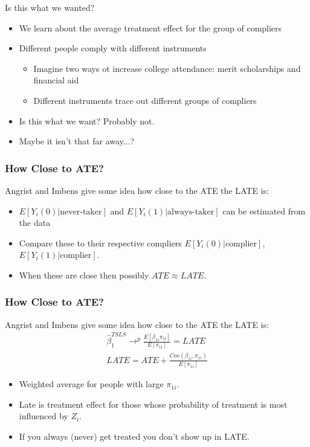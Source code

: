 \documentclass[xcolor=pdftex,dvipsnames,table,mathserif,aspectratio=169]{beamer}
\begin{document}
\begin{frame}{Is this what we wanted?}
\begin{itemize}
\item We learn about the average treatment effect for the group of \alert{compliers}
\item Different people comply with different instruments
\begin{itemize}
\item Imagine two ways ot increase college attendance: \alert{merit scholarships} and \alert{financial aid}
\item Different instruments trace out different groups of \alert{compliers}
\end{itemize}
\item Is this what we want? Probably not.
\item Maybe it isn't that far away...?
\end{itemize}

\end{frame}



\begin{frame}
\frametitle{How Close to ATE?}
Angrist and Imbens give some idea how close to the ATE the LATE is:
\begin{itemize}
\item $E[Y_i(0) | \text{never-taker}]$ and  $E[Y_i(1) | \text{always-taker}]$ can be estimated from the data
\item Compare these to their respective compliers $E[Y_i(0) | \text{complier}]$, $E[Y_i(1) | \text{complier}]$.
\item When these are close then possibly $ATE \approx LATE$.
\end{itemize}
\end{frame}

\begin{frame}
\frametitle{How Close to ATE?}
Angrist and Imbens give some idea how close to the ATE the LATE is:
\begin{eqnarray*}
\widehat{\beta}_1^{TSLS} \rightarrow^p \frac{E[\beta_{1i} \pi_{1i}]}{E[\pi_{i1}]} = LATE \\
LATE = ATE + \frac{Cov(\beta_{1i},\pi_{1i})}{E[\pi_{1i}]}
\end{eqnarray*}
\begin{itemize}
\item Weighted average for people with large $\pi_{1i}$.
\item Late is treatment effect for those whose probability of treatment is most influenced by $Z_i$.
\item If you always (never) get treated you don't show up in LATE.
\end{itemize}
\end{frame}
\end{document}

